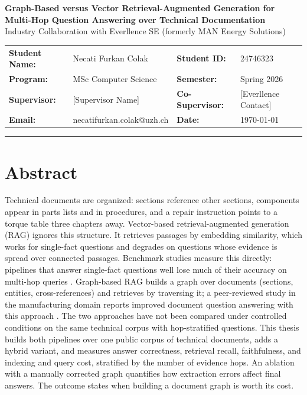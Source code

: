 \documentclass[10pt,a4paper]{article}
\begin{document}
\begin{center}
    {\Large \textbf{Graph-Based versus Vector Retrieval-Augmented Generation for\\[0.15em]Multi-Hop Question Answering over Technical Documentation}}\\[0.3em]
    {\normalsize Industry Collaboration with Everllence SE (formerly MAN Energy Solutions)}
\end{center}

\vspace{0.35em}

\noindent
\begin{tabularx}{\textwidth}{>{\bfseries}l X >{\bfseries}l X}
Student Name: & Necati Furkan Colak       & Student ID:    & 24746323 \\
Program:      & MSc Computer Science      & Semester:      & Spring 2026 \\
Supervisor:   & [Supervisor Name]         & Co-Supervisor: & [Everllence Contact] \\
Email:        & necatifurkan.colak@uzh.ch & Date:          & \today \\
\end{tabularx}

\vspace{0.5em}
\hrule
\vspace{0.5em}

\section{Abstract}

Technical documents are organized: sections reference other sections, components appear in parts lists and in procedures, and a repair instruction points to a torque table three chapters away. Vector-based retrieval-augmented generation (RAG) ignores this structure. It retrieves passages by embedding similarity, which works for single-fact questions and degrades on questions whose evidence is spread over connected passages. Benchmark studies measure this directly: pipelines that answer single-fact questions well lose much of their accuracy on multi-hop queries \cite{tang2024}. Graph-based RAG builds a graph over documents (sections, entities, cross-references) and retrieves by traversing it; a peer-reviewed study in the manufacturing domain reports improved document question answering with this approach \cite{documentgraphrag2025}. The two approaches have not been compared under controlled conditions on the same technical corpus with hop-stratified questions. This thesis builds both pipelines over one public corpus of technical documents, adds a hybrid variant, and measures answer correctness, retrieval recall, faithfulness, and indexing and query cost, stratified by the number of evidence hops. An ablation with a manually corrected graph quantifies how extraction errors affect final answers. The outcome states when building a document graph is worth its cost.
\end{document}
